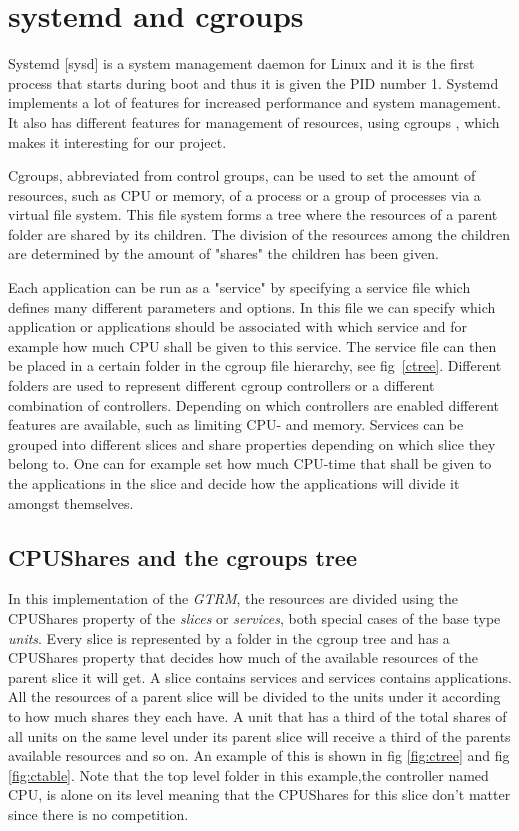 \documentclass[nobiblatex]{LTHthesis}
\begin{document}
\section{systemd and cgroups}
Systemd [sysd] is a system management daemon for Linux and it is the first process that starts during boot and thus it is given the PID number 1. Systemd implements a lot of features for increased performance and system management. It also has different features for management of resources, using cgroups \cite{cgroups}, which makes it interesting for our project. 

Cgroups, abbreviated from control groups, can be used to set the amount of resources, such as CPU or memory, of a process or a group of processes via a virtual file system. This file system forms a tree where the resources of a parent folder are shared by its children. The division of the resources among the children are determined by the amount of "shares" the children has been given. 

Each application can be run as a "service" by specifying a service file which defines many different parameters and options. In this file we can specify which application or applications should be associated with which service and for example how much CPU shall be given to this service. The service file can then be placed in a certain folder in the cgroup file hierarchy, see fig~\ref{ctree}. Different folders are used to represent different cgroup controllers or a different combination of controllers. Depending on which controllers are enabled different features are available, such as limiting CPU- and memory.   
 Services can be grouped into different slices and share properties depending on which slice they belong to.  
One can for example set how much CPU-time that shall be given to the applications in the slice and decide how the applications will divide it amongst themselves.



\subsection{CPUShares and the cgroups tree}
In this implementation of the \emph{GTRM}, the resources are divided using the CPUShares property of the \emph{slices} or \emph{services}, both special cases of the base type \emph{units}. Every slice is represented by a folder in the cgroup tree and has a CPUShares property that decides how much of the available resources of the parent slice it will get. A slice contains services and services contains applications. 
All the resources of a parent slice will be divided to the units under it according to how much shares they each have. A unit that has a third of the total shares of all units  on the same level under its parent slice will receive a third of the parents available resources and so on. An example of this is shown in fig \ref{fig:ctree} and fig \ref{fig:ctable}. Note that the top level folder in this example,the controller named CPU, is alone on its level meaning that the CPUShares for this slice don't matter since there is no competition.
\end{document}
